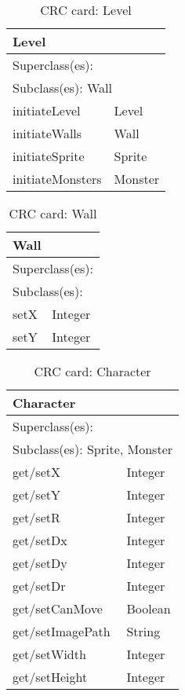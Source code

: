 \begin{table}[]
\centering
\label{crc_level}
\begin{tabular}{|l|l|}
\hline
\multicolumn{2}{|l|}{Level} \\ \hline
\multicolumn{2}{|l|}{Superclass(es):} \\ \hline
\multicolumn{2}{|l|}{Subclass(es): Wall} \\ \hline
initiateLevel           & Level \\ \hline
initiateWalls           & Wall \\ \hline
initiateSprite          & Sprite \\ \hline
initiateMonsters        & Monster \\ \hline
\end{tabular}
\caption{CRC card: Level}
\end{table}

\begin{table}[]
\centering
\label{crc_wall}
\begin{tabular}{|l|l|}
\hline
\multicolumn{2}{|l|}{Wall} \\ \hline
\multicolumn{2}{|l|}{Superclass(es):} \\ \hline
\multicolumn{2}{|l|}{Subclass(es):} \\ \hline
setX           & Integer \\ \hline
setY           & Integer\\ \hline
\end{tabular}
\caption{CRC card: Wall}
\end{table}

\begin{table}[]
\centering
\label{crc_character}
\begin{tabular}{|l|l|}
\hline
\multicolumn{2}{|l|}{Character} \\ \hline
\multicolumn{2}{|l|}{Superclass(es):} \\ \hline
\multicolumn{2}{|l|}{Subclass(es): Sprite, Monster} \\ \hline
get/setX           & Integer \\ \hline
get/setY           & Integer \\ \hline
get/setR           & Integer \\ \hline
get/setDx          & Integer \\ \hline
get/setDy          & Integer \\ \hline
get/setDr          & Integer \\ \hline
get/setCanMove     & Boolean \\ \hline
get/setImagePath   & String \\ \hline
get/setWidth       & Integer \\ \hline
get/setHeight      & Integer \\ \hline
\end{tabular}
\caption{CRC card: Character}
\end{table}

